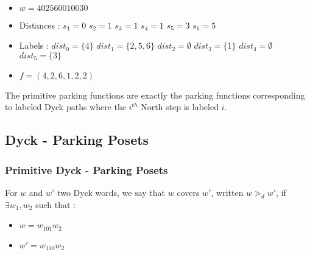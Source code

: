 \begin{example}[$n = 6, \mathcal{LD}_n \to \mathcal{PF}_n$]
    ~\
    \begin{itemize}
        \item $w = 402560010030$
    \end{itemize}
    
    \begin{itemize}
        \item Distances :
            \subitem $s_1 = 0$
            \hspace{2cm} $s_2 = 1$
            \hspace{2cm} $s_3 = 1$
            \subitem $s_4 = 1$
            \hspace{2cm} $s_5 = 3$
            \hspace{2cm} $s_6 = 5$
        \item Labels :
            \subitem $dist_0 = \{4\}$
            \hspace{2cm} $dist_1 = \{2, 5, 6\}$
            \hspace{2cm} $dist_2 = \emptyset$
            \subitem $dist_3 = \{1\}$
            \hspace{2cm} $dist_4 = \emptyset$
            \hspace{32mm} $dist_5 = \{3\}$
        \item $f = (4, 2, 6, 1, 2, 2)$
    \end{itemize}
\end{example}

\begin{rem}
    The primitive parking functions are exactly the
    parking functions corresponding to labeled Dyck paths
    where the $i^{th}$ North step is labeled $i$.
\end{rem}

\subsection{Dyck - Parking Posets}

\subsubsection{Primitive Dyck - Parking Posets}

\begin{definition}[$\gtrdot_d$]
    For $w$ and $w'$ two Dyck words, we say that $w$
    covers $w'$, written $w \gtrdot_d w'$, if
    $\exists w_1, w_2$ such that :
    \begin{itemize}
        \item $w = w_101w_2$
        \item $w' = w_110w_2$
    \end{itemize}  
\end{definition}


